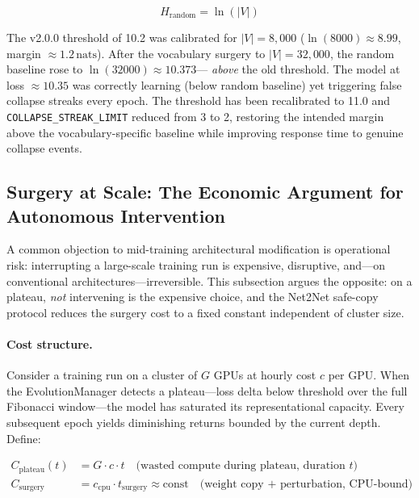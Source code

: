\documentclass[11pt,a4paper]{article}
\begin{document}
\begin{equation}
  H_{\text{random}} = \ln(|V|)
  \label{eq:random_baseline}
\end{equation}

The v2.0.0 threshold of 10.2 was calibrated for $|V|=8{,}000$
($\ln(8000) \approx 8.99$, margin $\approx 1.2\,\text{nats}$). After the vocabulary
surgery to $|V|=32{,}000$, the random baseline rose to $\ln(32000) \approx 10.373$---
\emph{above} the old threshold. The model at loss $\approx 10.35$ was correctly
learning (below random baseline) yet triggering false collapse streaks every epoch.
The threshold has been recalibrated to 11.0 and \texttt{COLLAPSE\_STREAK\_LIMIT}
reduced from 3 to 2, restoring the intended margin above the vocabulary-specific
baseline while improving response time to genuine collapse events.

\subsection{Surgery at Scale: The Economic Argument for Autonomous Intervention}

A common objection to mid-training architectural modification is operational risk:
interrupting a large-scale training run is expensive, disruptive, and---on
conventional architectures---irreversible. This subsection argues the opposite:
on a plateau, \emph{not} intervening is the expensive choice, and the Net2Net
safe-copy protocol reduces the surgery cost to a fixed constant independent of
cluster size.

\paragraph{Cost structure.}
Consider a training run on a cluster of $G$ GPUs at hourly cost $c$ per GPU.
When the EvolutionManager detects a plateau---loss delta below threshold over
the full Fibonacci window---the model has saturated its representational
capacity. Every subsequent epoch yields diminishing returns bounded by the
current depth. Define:

\begin{align}
  C_{\text{plateau}}(t) &= G \cdot c \cdot t
    \quad \text{(wasted compute during plateau, duration } t \text{)} \\
  C_{\text{surgery}} &= c_{\text{cpu}} \cdot t_{\text{surgery}}
    \approx \text{const}
    \quad \text{(weight copy + perturbation, CPU-bound)}
\end{align}
\end{document}
